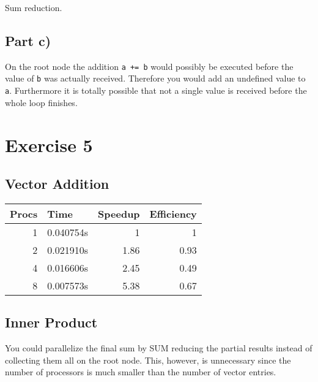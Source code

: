 \documentclass[10pt,a4paper]{article}
\begin{document}
Sum reduction.

\subsection*{Part c)}

On the root node the addition \texttt{a += b} would possibly be executed before the value of \texttt{b} was actually received.
Therefore you would add an undefined value to \texttt{a}.
Furthermore it is totally possible that not a single value is received before the whole loop finishes.

\section*{Exercise 5}

\subsection*{Vector Addition}

\begin{tabular}{rlrr}
Procs & Time & Speedup & Efficiency\\
\hline
1 & 0.040754s & 1 & 1\\
2 & 0.021910s & 1.86 & 0.93\\
4 & 0.016606s & 2.45 & 0.49\\
8 & 0.007573s & 5.38 & 0.67\\
\end{tabular}
\begin{comment}
#+ORGTBL: SEND exercise-5-sum orgtbl-to-latex :splice nil :skip 0
| Procs | Time      | Speedup | Efficiency |
|-------+-----------+---------+------------|
|     1 | 0.040754s |       1 |          1 |
|     2 | 0.021910s |    1.86 |       0.93 |
|     4 | 0.016606s |    2.45 |       0.49 |
|     8 | 0.007573s |    5.38 |       0.67 |
\end{comment}

\subsection*{Inner Product}

You could parallelize the final sum by SUM reducing the partial results instead of collecting them all on the root node.
This, however, is unnecessary since the number of processors is much smaller than the number of vector entries.
\end{document}
